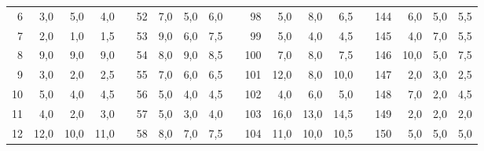 \begin{table}[H]
{\begin{tabular}{|r|r|r|r|l|r|r|r|r|l|r|r|r|r|lrrrr}
6                                & 3,0                          & 5,0                          & 4,0                          &  & 52 & 7,0  & 5,0  & 6,0  &  & 98  & 5,0  & 8,0  & 6,5  & \multicolumn{1}{l|}{} & \multicolumn{1}{r|}{144} & \multicolumn{1}{r|}{6,0}  & \multicolumn{1}{r|}{5,0}  & \multicolumn{1}{r|}{5,5}  \\ \cline{1-4} \cline{6-9} \cline{11-14} \cline{16-19} 
7                                & 2,0                          & 1,0                          & 1,5                          &  & 53 & 9,0  & 6,0  & 7,5  &  & 99  & 5,0  & 4,0  & 4,5  & \multicolumn{1}{l|}{} & \multicolumn{1}{r|}{145} & \multicolumn{1}{r|}{4,0}  & \multicolumn{1}{r|}{7,0}  & \multicolumn{1}{r|}{5,5}  \\ \cline{1-4} \cline{6-9} \cline{11-14} \cline{16-19} 
8                                & 9,0                          & 9,0                          & 9,0                          &  & 54 & 8,0  & 9,0  & 8,5  &  & 100 & 7,0  & 8,0  & 7,5  & \multicolumn{1}{l|}{} & \multicolumn{1}{r|}{146} & \multicolumn{1}{r|}{10,0} & \multicolumn{1}{r|}{5,0}  & \multicolumn{1}{r|}{7,5}  \\ \cline{1-4} \cline{6-9} \cline{11-14} \cline{16-19} 
9                                & 3,0                          & 2,0                          & 2,5                          &  & 55 & 7,0  & 6,0  & 6,5  &  & 101 & 12,0 & 8,0  & 10,0 & \multicolumn{1}{l|}{} & \multicolumn{1}{r|}{147} & \multicolumn{1}{r|}{2,0}  & \multicolumn{1}{r|}{3,0}  & \multicolumn{1}{r|}{2,5}  \\ \cline{1-4} \cline{6-9} \cline{11-14} \cline{16-19} 
10                               & 5,0                          & 4,0                          & 4,5                          &  & 56 & 5,0  & 4,0  & 4,5  &  & 102 & 4,0  & 6,0  & 5,0  & \multicolumn{1}{l|}{} & \multicolumn{1}{r|}{148} & \multicolumn{1}{r|}{7,0}  & \multicolumn{1}{r|}{2,0}  & \multicolumn{1}{r|}{4,5}  \\ \cline{1-4} \cline{6-9} \cline{11-14} \cline{16-19} 
11                               & 4,0                          & 2,0                          & 3,0                          &  & 57 & 5,0  & 3,0  & 4,0  &  & 103 & 16,0 & 13,0 & 14,5 & \multicolumn{1}{l|}{} & \multicolumn{1}{r|}{149} & \multicolumn{1}{r|}{2,0}  & \multicolumn{1}{r|}{2,0}  & \multicolumn{1}{r|}{2,0}  \\ \cline{1-4} \cline{6-9} \cline{11-14} \cline{16-19} 
12                               & 12,0                         & 10,0                         & 11,0                         &  & 58 & 8,0  & 7,0  & 7,5  &  & 104 & 11,0 & 10,0 & 10,5 & \multicolumn{1}{l|}{} & \multicolumn{1}{r|}{150} & \multicolumn{1}{r|}{5,0}  & \multicolumn{1}{r|}{5,0}  & \multicolumn{1}{r|}{5,0}  \\ \cline{1-4} \cline{6-9} \cline{11-14} \cline{16-19} 

\end{tabular}}
\end{table}
